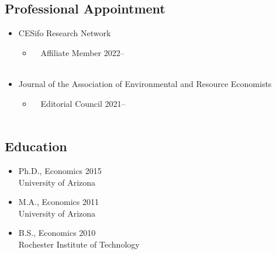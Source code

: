\documentclass[12pt]{res} %
\begin{document}
\begin{resume}
\subsection{Professional Appointment}
	\begin{itemize} \itemsep -12pt
		\item[] CESifo Research Network 
		\vspace{-0.05in} 
		\begin{itemize}
			\item[] \,\,\,\, Affiliate Member \hfill 2022--\\\
		\end{itemize}
		\vspace{-0.05in}
		\item[] Journal of the Association of Environmental and Resource Economists 
		\vspace{-0.05in} 
		\begin{itemize}
			\item[] \,\,\,\, Editorial Council \hfill 2021--\\\
		\end{itemize}
	\end{itemize}
\vspace{-0.5in}
\subsection{Education}


	\begin{itemize}
		\item[] Ph.D., Economics \hfill 2015\\
		University of Arizona

		\item[] M.A., Economics \hfill 2011\\
		University of Arizona

		\item[] B.S.,  Economics \hfill 2010\\
		Rochester Institute of Technology

	\end{itemize}
\vspace{-.2in}

\end{resume}
\end{document}
